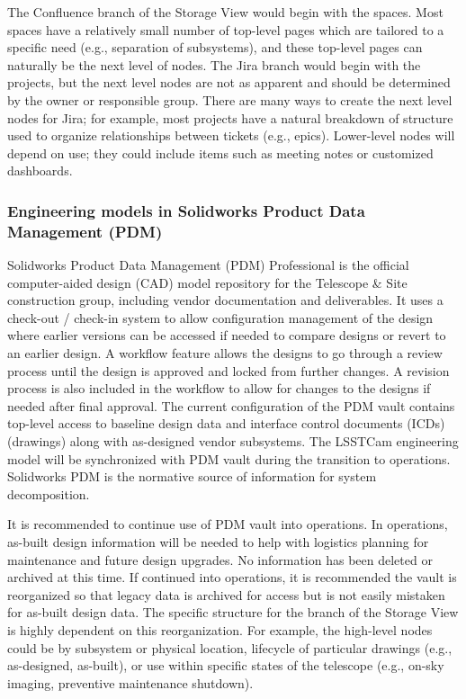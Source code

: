 The Confluence branch of the Storage View would begin with the spaces.
Most spaces have a relatively small number of top-level pages which are tailored to a specific need (e.g., separation of subsystems), and these top-level pages can naturally be the next level of nodes.
The Jira branch would begin with the projects, but the next level nodes are not as apparent and should be determined by the owner or responsible group.
There are many ways to create the next level nodes for Jira; for example, most projects have a natural breakdown of structure used to organize relationships between tickets (e.g., epics).
Lower-level nodes will depend on use; they could include items such as meeting notes or customized dashboards.

\subsubsection{Engineering models in Solidworks Product Data Management (PDM)}

Solidworks Product Data Management (PDM) Professional \citep{PDM-cite} is the official computer-aided design (CAD) model repository for the Telescope \& Site construction group, including vendor documentation and deliverables.
It uses a check-out / check-in system to allow configuration management of the design where earlier versions can be accessed if needed to compare designs or revert to an earlier design.
A workflow feature allows the designs to go through a review process until the design is approved and locked from further changes.
A revision process is also included in the workflow to allow for changes to the designs if needed after final approval.
The current configuration of the PDM vault contains top-level access to baseline design data and interface control documents (ICDs) (drawings) along with as-designed vendor subsystems.
The LSSTCam engineering model will be synchronized with PDM vault during the transition to operations.
Solidworks PDM is the normative source of information for system decomposition.

It is recommended to continue use of PDM vault into operations.
In operations, as-built design information will be needed to help with logistics planning for maintenance and future design upgrades.
No information has been deleted or archived at this time.
If continued into operations, it is recommended the vault is reorganized so that legacy data is archived for access but is not easily mistaken for as-built design data.
The specific structure for the branch of the Storage View is highly dependent on this reorganization.
For example, the high-level nodes could be by subsystem or physical location, lifecycle of particular drawings (e.g., as-designed, as-built), or use within specific states of the telescope (e.g., on-sky imaging, preventive maintenance shutdown).

